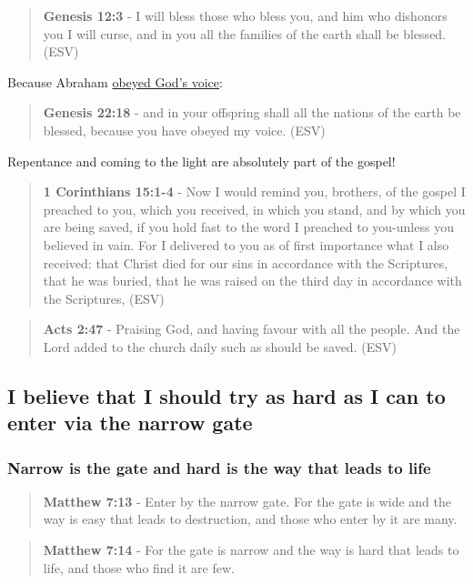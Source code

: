 \documentclass[11pt]{article}
\begin{document}
\begin{quote}
\textbf{Genesis 12:3} - I will bless those who bless you, and him who dishonors you I will curse, and in you all the families of the earth shall be blessed. (ESV)
\end{quote}

Because Abraham \uline{obeyed God's voice}:

\begin{quote}
\textbf{Genesis 22:18} - and in your offspring shall all the nations of the earth be blessed, because you have obeyed my voice. (ESV)
\end{quote}

Repentance and coming to the light are absolutely part of the gospel!

\begin{quote}
\textbf{1 Corinthians 15:1-4} -  Now I would remind you, brothers, of the gospel I preached to you, which you received, in which you stand, and by which you are being saved, if you hold fast to the word I preached to you-unless you believed in vain.  For I delivered to you as of first importance what I also received: that Christ died for our sins in accordance with the Scriptures, that he was buried, that he was raised on the third day in accordance with the Scriptures,  (ESV)
\end{quote}

\begin{quote}
\textbf{Acts 2:47} - Praising God, and having favour with all the people. And the Lord added to the church daily such as should be saved. (ESV)
\end{quote}

\subsection{I believe that I should try as hard as I can to enter via the narrow gate}
\label{sec:org71b653a}
\subsubsection{Narrow is the gate and hard is the way that leads to life}
\label{sec:orgcc1e07d}
\begin{quote}
\textbf{Matthew 7:13} - Enter by the narrow gate. For the gate is wide and the way is easy that leads to destruction, and those who enter by it are many.
\end{quote}

\begin{quote}
\textbf{Matthew 7:14} - For the gate is narrow and the way is hard that leads to life, and those who find it are few.
\end{quote}
\end{document}
